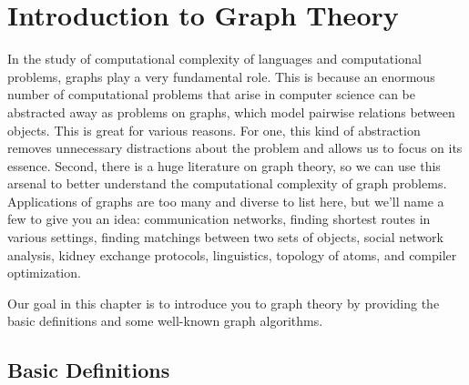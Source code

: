 \chapter{Introduction to Graph Theory}
\label{chapter:intro-to-graph-theory}

\begin{preamble}
\label{prmbl:intro-to-graph-theory::study}
In the study of computational complexity of languages and computational problems, graphs play a very fundamental role. This is because an enormous number of computational problems that arise in computer science can be abstracted away as problems on graphs, which model pairwise relations between objects. This is great for various reasons. For one, this kind of abstraction removes unnecessary distractions about the problem and allows us to focus on its essence. Second, there is a huge literature on graph theory, so we can use this arsenal to better understand the computational complexity of graph problems. Applications of graphs are too many and diverse to list here, but we'll name a few to give you an idea: communication networks, finding shortest routes in various settings, finding matchings between two sets of objects, social network analysis, kidney exchange protocols, linguistics, topology of atoms, and compiler optimization.

Our goal in this chapter is to introduce you to graph theory by providing the basic definitions and some well-known graph algorithms.

\end{preamble}


\section{Basic Definitions}
\label{sec:intro-to-graph-theory::basic-definitions}

